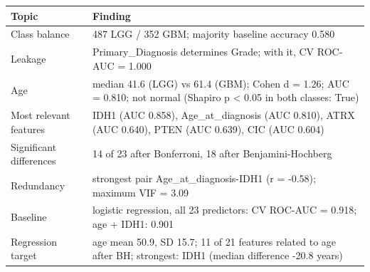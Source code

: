 \begin{tabular}{lp{12cm}}
\toprule
\textbf{Topic} & \textbf{Finding} \\
\midrule
Class balance & 487 LGG / 352 GBM; majority baseline accuracy 0.580 \\
Leakage & Primary\_Diagnosis determines Grade; with it, CV ROC-AUC = 1.000 \\
Age & median 41.6 (LGG) vs 61.4 (GBM); Cohen d = 1.26; AUC = 0.810; not normal (Shapiro p < 0.05 in both classes: True) \\
Most relevant features & IDH1 (AUC 0.858), Age\_at\_diagnosis (AUC 0.810), ATRX (AUC 0.640), PTEN (AUC 0.639), CIC (AUC 0.604) \\
Significant differences & 14 of 23 after Bonferroni, 18 after Benjamini-Hochberg \\
Redundancy & strongest pair Age\_at\_diagnosis-IDH1 (r = -0.58); maximum VIF = 3.09 \\
Baseline & logistic regression, all 23 predictors: CV ROC-AUC = 0.918; age + IDH1: 0.901 \\
Regression target & age mean 50.9, SD 15.7; 11 of 21 features related to age after BH; strongest: IDH1 (median difference -20.8 years) \\
\bottomrule
\end{tabular}
